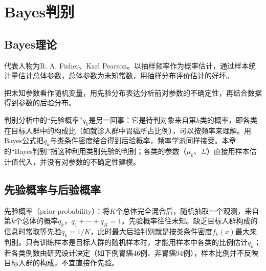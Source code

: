 \section{Bayes判别}
\subsection{Bayes理论}
\begin{description}[style=nextline,leftmargin=0pt,labelwidth=0pt,labelsep=0pt]
\item[经典统计学派：频率学派]代表人物为R. A. Fisher、Karl Pearson。以抽样频率作为概率估计，通过样本统计量估计总体参数，总体参数为未知常数，用抽样分布评价估计的好坏。
\item[Bayes统计学派]把未知参数看作随机变量，用先验分布表达分析前对参数的不确定性，再结合数据得到参数的后验分布。
\end{description}
判别分析中的“先验概率”$q_k$是另一回事：它是待判对象来自第$k$类的概率，即各类在目标人群中的构成比（如就诊人群中胃癌所占比例），可以按频率来理解。用Bayes公式把$q_k$与类条件密度结合得到后验概率，频率学派同样接受。本章的“Bayes判别”指这种利用类别先验的判别；各类的参数（$\mu_k$、$\Sigma$）直接用样本估计值代入，并没有对参数的不确定性建模。
\subsection{先验概率与后验概率}
先验概率（prior probability）：将$K$个总体完全混合后，随机抽取一个观测，来自第$k$个总体的概率$q_k$，$q_1+\cdots+q_K=1$。先验概率往往未知。缺乏目标人群构成的信息时常取等先验$q_k=1/K$，此时最大后验判别就是按类条件密度$f_k(x)$最大来判别。只有训练样本是目标人群的随机样本时，才能用样本中各类的比例估计$q_k$；若各类例数由研究设计决定（如下例胃癌46例、非胃癌94例），样本比例并不反映目标人群的构成，不宜直接作先验。

